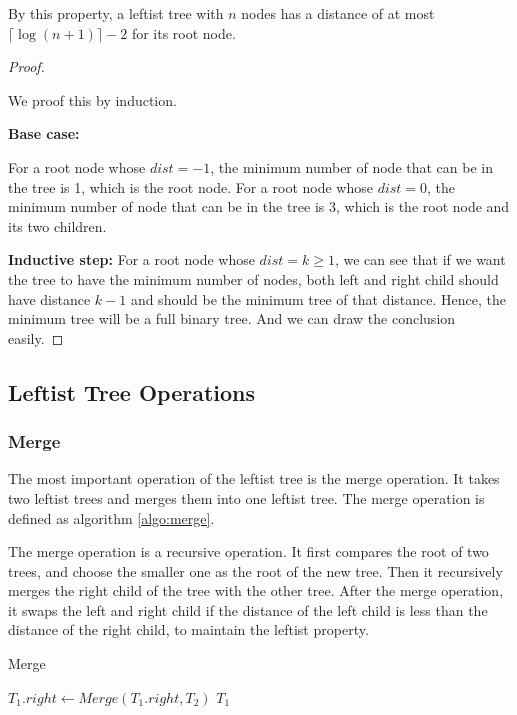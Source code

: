 \documentclass[a4paper,12pt]{article}
\begin{document}
By this property, a leftist tree with $n$ nodes has a distance of at most $\lceil \log (n+1) \rceil - 2$ for its root node.
\begin{proof}
$ $

We proof this by induction.

\textbf{Base case:} 

For a root node whose $dist =  -1$, the minimum number of node that can be in the tree is 1, which is the root node.
For a root node whose $dist = 0$, the minimum number of node that can be in the tree is 3, which is the root node and its two children.

\textbf{Inductive step:}
For a root node whose $dist = k \geq 1$, we can see that if we want the tree to have the minimum number of nodes, both left and right child should have distance $k-1$ and should be the minimum tree of that distance.
Hence, the minimum tree will be a full binary tree.
And we can draw the conclusion easily.
\end{proof}

\subsection*{Leftist Tree Operations}

\subsubsection*{Merge}

The most important operation of the leftist tree is the merge operation.
It takes two leftist trees and merges them into one leftist tree.
The merge operation is defined as algorithm \ref{algo:merge}.

The merge operation is a recursive operation.
It first compares the root of two trees, and choose the smaller one as the root of the new tree.
Then it recursively merges the right child of the tree with the other tree.
After the merge operation, it swaps the left and right child if the distance of the left child is less than the distance of the right child, to maintain the leftist property.

\begin{algorithm}[H]
	\caption{Merge}
	\label{algo:merge}
	$T_1.right \leftarrow Merge(T_1.right, T_2)$\;
	\Return $T_1$\;
\end{algorithm}
\end{document}
